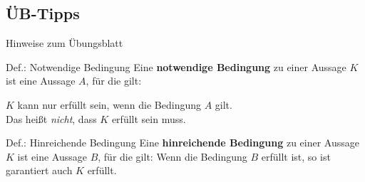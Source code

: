 \subsection{ÜB-Tipps}
\begin{frame}{Hinweise zum Übungsblatt}
	\begin{block}{Def.: Notwendige Bedingung}
		Eine \textbf{notwendige Bedingung} zu einer Aussage $K$ ist eine Aussage $A$, für die gilt:

		{\center $K$ kann nur erfüllt sein, wenn die Bedingung $A$ gilt.}
		\\[0.5em]
		Das heißt \textit{nicht}, dass $K$ erfüllt sein muss.
	\end{block}

	\begin{block}{Def.: Hinreichende Bedingung}
		Eine \textbf{hinreichende Bedingung} zu einer Aussage $K$ ist eine Aussage $B$, für die gilt:
		\center Wenn die Bedingung $B$ erfüllt ist, so ist garantiert auch $K$ erfüllt.
	\end{block}
\end{frame}